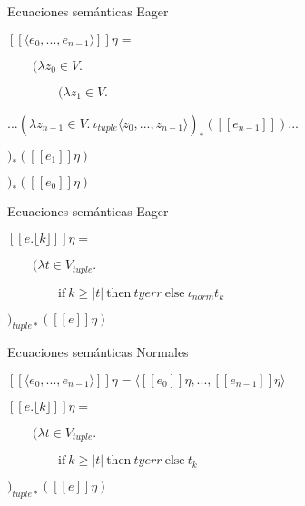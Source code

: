 \documentclass[handout]{beamer}
\newcommand{\se}[1]{\mbox{$[\![#1]\!]$}}
\begin{document}
\begin{frame}{Ecuaciones semánticas Eager}

\bigskip

$
\se{\langle e_0,...,e_{n-1}\rangle }\eta = $

\bigskip

$\qquad(\lambda z_{0}\in V.$

\medskip


$\qquad\qquad(\lambda z_{1}\in V.$

\medskip

\qquad\qquad\qquad$ ...(\lambda z_{n-1}\in V.\ \iota_{\underline{tuple}}\langle z_0,...,z_{n-1}\rangle)_*(\se{e_{n-1}})...$

\medskip

\qquad\qquad$)_*(\se{e_{1}}\eta)  $

\medskip

\qquad$)_*(\se{e_{0}}\eta)  $
\end{frame}

\begin{frame}{Ecuaciones semánticas Eager}

\bigskip

$
\se{e.\lfloor k\rfloor }\eta = $

\bigskip

$\qquad(\lambda t\in V_{tuple}.\ $

\medskip


$\qquad\qquad\text{if}\ k\geq |t|\ \text{then} \ tyerr\ \text{else}\ \iota_{norm}t_k $

\medskip

\qquad$)_{tuple*}(\se{e}\eta)  $
\end{frame}


\begin{frame}{Ecuaciones semánticas Normales}

\bigskip

$
\se{\langle e_0,...,e_{n-1}\rangle }\eta = \langle \se{e_{0}}\eta,...,\se{e_{n-1}}\eta\rangle$

\bigskip

\pause
$
\se{e.\lfloor k\rfloor }\eta = $

\bigskip

$\qquad(\lambda t\in V_{tuple}.\ $

\medskip


$\qquad\qquad\text{if}\ k\geq |t|\ \text{then} \ tyerr\ \text{else}\ t_k $

\medskip

\qquad$)_{tuple*}(\se{e}\eta)  $
\end{frame}
\end{document}
